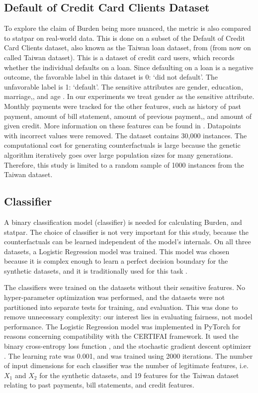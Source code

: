 \documentclass[runningheads]{llncs}
\begin{document}
\subsection{Default of Credit Card Clients Dataset}\label{sec:taiwan}

To explore the claim of \gls{Burden} being more nuanced, the metric is also
compared to \gls{statpar} on real-world data. This is done on a subset of the
Default of Credit Card Clients dataset, also known as the Taiwan loan dataset,
from \cite{dataset} (from now on called Taiwan dataset). This is a dataset of
credit card users, which records whether the individual defaults on a loan.
Since defaulting on a loan is a negative outcome, the favorable label in this
dataset is 0: `did not default'. The unfavorable label is 1: `default'. The
sensitive attributes are gender, education, marriage,, and age \cite{eusex}. In
our experiments we treat gender as the sensitive attribute. Monthly payments
were tracked for the other features, such as history of past payment, amount of
bill statement, amount of previous payment,, and amount of given credit. More
information on these features can be found in \cite{dataset}. Datapoints with
incorrect values were removed. The dataset contains 30,000 instances. The
computational cost for generating counterfactuals is large because the genetic
algorithm iteratively goes over large population sizes for many generations.
Therefore, this study is limited to a random sample of 1000 instances from the
Taiwan dataset.


\subsection{Classifier}\label{sec:model}

A binary classification model (classifier) is needed for calculating
\gls{Burden}, and \gls{statpar}. The choice of classifier is not very important
for this study, because the counterfactuals can be learned independent of the
model's internals. On all three datasets, a Logistic Regression model
\cite{cox1958regression} was trained. This model was chosen because it is
complex enough to learn a perfect decision boundary for the synthetic datasets,
and it is traditionally used for this task \cite{crook2007recent}.

The classifiers were trained on the datasets without their sensitive features.
No hyper-parameter optimization was performed, and the datasets were not
partitioned into separate tests for training, and evaluation. This was done to
remove unnecessary complexity: our interest lies in evaluating fairness, not
model performance. The Logistic Regression model was implemented in PyTorch for
reasons concerning compatibility with the CERTIFAI framework. It used the
binary cross-entropy loss function \cite{cox1958regression}, and the stochastic
gradient descent optimizer \cite{robbins1951stochastic}. The learning rate was
0.001, and was trained using 2000 iterations. The number of input dimensions
for each classifier was the number of \gls{legitimate} features, i.e. $X_1$ and
$X_2$ for the synthetic datasets, and 19 features for the Taiwan dataset
relating to past payments, bill statements, and credit features.
\end{document}
